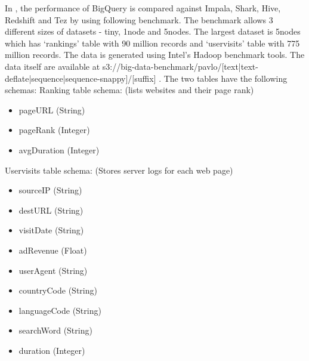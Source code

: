 \documentclass[9pt,twocolumn,twoside]{../../styles/osajnl}
\begin{document}
\noindent
In \cite{www-benchmarks-bigguery}, the performance of BigQuery is
compared against Impala, Shark, Hive, Redshift and Tez by using
following benchmark. The benchmark allows 3 different sizes of
datasets - tiny, 1node and 5nodes. The largest dataset is 5nodes which
has ‘rankings’ table with 90 million records and ‘uservisits’ table
with 775 million records. The data is generated using Intel's Hadoop
benchmark tools. The data itself are available at
s3://big-data-benchmark/pavlo/[text|text-deflate|sequence|sequence-snappy]/[suffix]
.
 The
two tables have the following schemas:\newline \newline
\noindent
Ranking table schema: (lists websites and their page rank)
\begin{itemize}[noitemsep,topsep=0pt] \item pageURL (String) \item pageRank (Integer) \item avgDuration (Integer) \newline
\end{itemize}
\noindent
Uservisits table schema: (Stores server logs for each web page)
\begin{itemize}[noitemsep,topsep=0pt] \item sourceIP (String) \item destURL (String) \item visitDate (String) \item adRevenue (Float) \item userAgent (String) \item countryCode (String) \item languageCode (String) \item searchWord (String) \item duration (Integer) \newline
\end{itemize}
\end{document}

